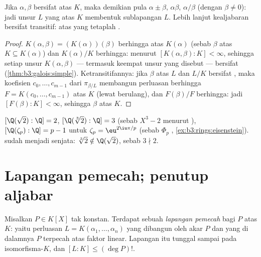 \begin{corollary}\label{cor:b3:galois:algclosed}
Jika $\alpha, \beta$ bersifat  atas $K$, maka demikian pula $\alpha \pm
\beta$, $\alpha\beta$, $\alpha/\beta$ (dengan $\beta \ne 0$): jadi
unsur $L$ yang  atas $K$ membentuk sublapangan $L$.
Lebih lanjut kealjabaran bersifat transitif:  atas yang  tetaplah
.
\end{corollary}

\begin{proof}
$K(\alpha, \beta) = (K(\alpha))(\beta)$ berhingga atas
$K(\alpha)$ (sebab $\beta$  atas $K \subseteq K(\alpha)$) dan
$K(\alpha)/K$ berhingga: menurut  $[K(\alpha,\beta):K] <
\infty$, sehingga setiap unsur $K(\alpha, \beta)$ --- termasuk
keempat unsur yang disebut --- bersifat  (\cref{thm:b3:galois:simple}).
Ketransitifannya: jika $\beta$  atas $L$ dan $L/K$ bersifat
, maka koefisien $c_0, \dots, c_{m-1}$ dari
$\pi_{\beta/L}$ membangun perluasan berhingga $F = K(c_0, \dots,
c_{m-1})$ atas $K$ (lewat  berulang), dan $F(\beta)/F$
berhingga: jadi $[F(\beta):K] < \infty$, sehingga $\beta$  atas
$K$.
\end{proof}

\begin{example}\label{ex:b3:galois:degrees}
$[\Q(\sqrt2):\Q] = 2$, $[\Q(\sqrt[3]2):\Q] = 3$ (sebab $X^3 - 2$
 menurut ), $[\Q(\zeta_p):\Q] = p - 1$ untuk
$\zeta_p = \eu^{2\iu\pi/p}$ (sebab $\Phi_p$ ,
\cref{ex:b3:rings:eisenstein}).  sudah menjadi
senjata: $\sqrt[3]2 \notin \Q(\sqrt2)$, sebab $3 \nmid 2$.
\end{example}

\section{Lapangan pemecah; penutup aljabar}

\begin{theorem}\label{thm:b3:galois:splitting}
Misalkan $P \in K[X]$ tak konstan. Terdapat sebuah \emph{lapangan
pemecah} bagi $P$ atas $K$: yaitu perluasan $L =
K(\alpha_1, \dots, \alpha_n)$ yang dibangun oleh akar $P$ dan yang di dalamnya
$P$ terpecah atas faktor linear. Lapangan itu tunggal sampai pada
isomorfisma-$K$, dan $[L:K] \leq (\deg P)!$.
\end{theorem}

